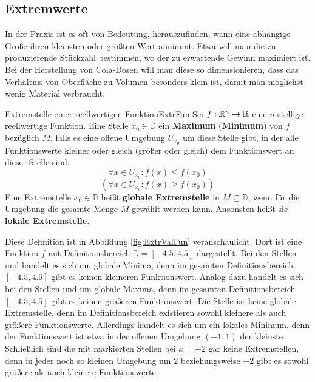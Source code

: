 \subsection{Extremwerte}

In der Praxis ist es oft von Bedeutung, herauszufinden, wann eine abhängige Größe ihren kleinsten oder größten Wert annimmt. Etwa will man die zu produzierende Stückzahl bestimmen, wo der zu erwartende Gewinn maximiert ist. Bei der Herstellung von Cola-Dosen will man diese so dimensionieren, dass das Verhältnis von Oberfläche zu Volumen besonders klein ist, damit man möglichst wenig Material verbraucht.

\begin{definition}{Extremstelle einer reellwertigen Funktion}{ExtrFun}
    Sei $f: \mathbb{R}^n \to \mathbb{R}$ eine $n$-stellige reellwertige Funktion. Eine Stelle $x_0\in\mathbb{D}$ ein \textbf{Maximum} (\textbf{Minimum}) von $f$ bezüglich $M$, falls es eine offene Umgebung $U_{x_0}$ um diese Stelle gibt, in der alle Funktionswerte kleiner oder gleich (größer oder gleich) dem Funktionswert an dieser Stelle sind:
    $$
        \forall x \in U_{x_0}: f(x) \le f(x_0)
    $$
    $$
        (\forall x \in U_{x_0}: f(x) \ge f(x_0))
    $$
    Eine Extremstelle $x_0 \in \mathbb{D}$ heißt \textbf{globale Extremstelle} in $M\subseteq\mathbb{D}$, wenn für die Umgebung die gesamte Menge $M$ gewählt werden kann. Ansonsten heißt sie \textbf{lokale Extremstelle}.
\end{definition}

Diese Definition ist in Abbildung \ref{fig:ExtrValFun} veranschaulicht. Dort ist eine Funktion $f$ mit Definitionsbereich $\mathbb{D} = [-4.5, 4.5]$ dargestellt. Bei den Stellen  und  handelt es sich um globale Minima, denn im gesamten Definitionsbereich $[-4.5,4.5]$ gibt es keinen kleineren Funktionswert. Analog dazu handelt es sich bei den Stellen  und  um globale Maxima, denn im gesamten Definitionsbereich $[-4.5,4.5]$ gibt es keinen größeren Funktionswert. Die Stelle  ist keine globale Extremstelle, denn im Definitionsbereich existieren sowohl kleinere als auch größere Funktionswerte. Allerdings handelt es sich um ein lokales Minimum, denn der Funktionswert ist etwa in der offenen Umgebung $(-1:1)$ der kleinste. Schließlich sind die mit  markierten Stellen bei $x=\pm 2$ gar keine Extremstellen, denn in jeder noch so kleinen Umgebung um $2$ beziehungsweise $-2$ gibt es sowohl größere als auch kleinere Funktionswerte.

